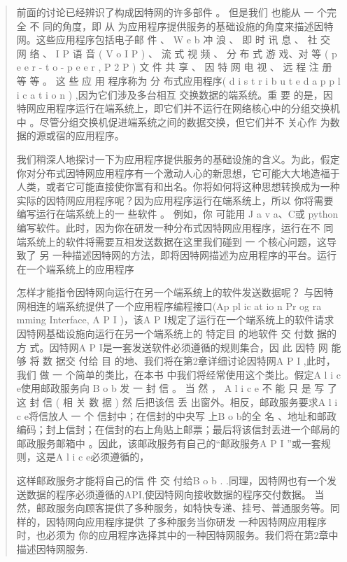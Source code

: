 \documentclass[
]{article}
\begin{document}
\begin{quote}
前面的讨论已经辨识了构成因特网的许多部件 。 但是我们 也能从 一 个完全 不
同的角度，即 从
为应用程序提供服务的基础设施的角度来描述因特网。这些应用程序包括电子邮
件 、 W e b 冲 浪 、 即 时 讯 息 、 社 交 网 络 、 I P 语 音 ( V o I P )
、 流 式 视 频 、 分 布 式 游 戏、对 等 ( p e e r - t o - p e e r , P 2
P ) 文 件 共 享 、 因 特 网 电 视 、 远 程 注 册 等 等 。 这 些 应 用
程序称为 分 布式应用程序( d i s t r i b u t e d a p p l i c a t i o n )
,因为它们涉及多台相互 交换数据的端系统。重 要
的是，因特网应用程序运行在端系统上，即它们并不运行在网络核心中的分组交换机中
。尽管分组交换机促进端系统之间的数据交换，但它们并不 关心作
为数据的源或宿的应用程序。

我们稍深人地探讨一下为应用程序提供服务的基础设施的含义。为此，假定你对分布式因特网应用程序有一个激动人心的新思想，它可能大大地造福于人类，或者它可能直接使你富有和出名。你将如何将这种思想转换成为一种实际的因特网应用程序呢？因为应用程序运行在端系统上，所以
你将需要编写运行在端系统上的一 些软件 。 例如，你 可能用 J a v a、C或
python 编写软件。此时，因为你在研发一种分布式因特网应用程序，运行在不
同端系统上的软件将需要互相发送数据在这里我们碰到 一 个核心问题，这导致了
另
一种描述因特网的方法，即将因特网描述为应用程序的平台。运行在一个端系统上的应用程序

怎样才能指令因特网向运行在另一个端系统上的软件发送数据呢？
与因特网相连的端系统提供了一个应用程序编程接口(Ap pl ic at io n Pr og ra
mming Interface, A P I )，该A P
I规定了运行在一个端系统上的软件请求因特网基础设施向运行在另一个端系统上的
特定目 的地软件 交 付数 据的方 式。因特网A P
I是一套发送软件必须遵循的规则集合，因 此 因特 网 能够 将 数 据交 付给 目
的地、我们将在第2章详细讨论因特网A P I ,此时，我们 做 一
个简单的类比，在本书 中我们将经常使用这个类比。假定A l i c
e使用邮政服务向 B o b 发 一 封 信 。 当 然 ， A l i c e 不 能 只 是 写
了 这 封 信 ( 相 关 数 据 ) 然 后把该信 丢 出窗外。相反，邮政服务要求A l
i c e将信放人 一 个 信封中；在信封的中央写 上B o b的全 名
、地址和邮政编码；封上信封；在信封的右上角贴上邮票；最后将该信封丢进一个邮局的邮政服务邮箱中
。因此，该邮政服务有自己的``邮政服务A P I ''或一套规则，这是A l i c
e必须遵循的，

这样邮政服务才能将自己的信 件 交 付给B o b .
.同理，因特网也有一个发送数据的程序必须遵循的API,使因特网向接收数据的程序交付数据。
当然，邮政服务向顾客提供了多种服务，如特快专递、挂号、普通服务等。同样的，因特网向应用程序提供
了多种服务当你研发 一种因特网应用程序时，也必须为
你的应用程序选择其中的一种因特网服务。我们将在第2章中描述因特网服务.
\end{quote}
\end{document}
